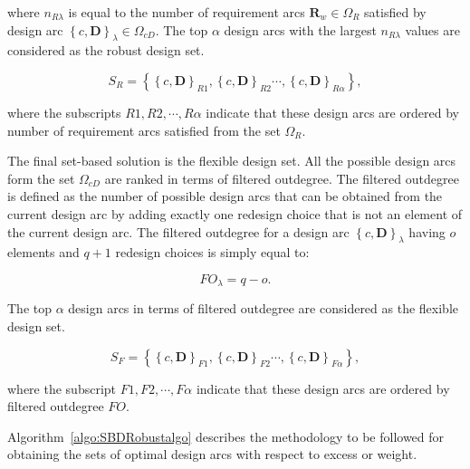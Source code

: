 where $n_{R\lambda}$ is equal to the number of requirement arcs $\mathbf{R}_w \in \Omega_R$ satisfied by design arc $\left\{c,\mathbf{D}\right\}_\lambda \in \Omega_{cD}$. The top $\alpha$ design arcs with the largest $n_{R\lambda}$ values are considered as the robust design set.

\begin{equation} \label{eq:SBDrobust}
	S_R = \left\{\left\{c,\mathbf{D}\right\}_{R1},\left\{c,\mathbf{D}\right\}_{R2}\cdots,\left\{c,\mathbf{D}\right\}_{R\alpha}\right\},
\end{equation}

where the subscripts $R1,R2,\cdots,R\alpha$ indicate that these design arcs are ordered by number of requirement arcs satisfied from the set $\Omega_R$.

The final set-based solution is the flexible design set. All the possible design arcs form the set $\Omega_{cD}$ are ranked in terms of filtered outdegree. The filtered outdegree is defined as the number of possible design arcs that can be obtained from the current design arc by adding exactly one redesign choice that is not an element of the current design arc. The filtered outdegree for a design arc $\left\{c,\mathbf{D}\right\}_\lambda$ having $o$ elements and $q + 1$ redesign choices is simply equal to:

\begin{equation} \label{eq:filteredoutdegree}
	FO_{\lambda} = q - o.
\end{equation}

The top $\alpha$ design arcs in terms of filtered outdegree are considered as the flexible design set.

\begin{equation} \label{eq:SBDflexible}
	S_F = \left\{\left\{c,\mathbf{D}\right\}_{F1},\left\{c,\mathbf{D}\right\}_{F2}\cdots,\left\{c,\mathbf{D}\right\}_{F\alpha}\right\},
\end{equation}

where the subscript $F1,F2,\cdots,F\alpha$ indicate that these design arcs are ordered by filtered outdegree $FO$.

Algorithm~\ref{algo:SBDRobustalgo} describes the methodology to be followed for obtaining the sets of optimal design arcs with respect to excess or weight.

